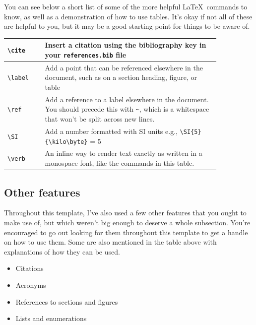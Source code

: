 You can see below a short list of some of the more helpful \LaTeX\ commands to know, as well as a
demonstration of how to use tables. It's okay if not all of these are helpful to you, but it may
be a good starting point for things to be aware of.

\begin{table}[ht]
	\centering
	\begin{tabular}{|p{0.15\linewidth}|p{0.70\linewidth}|}
		\hline
		\verb|\cite|  & Insert a citation using the bibliography key in your \verb|references.bib| file                              \\
		\hline
		\verb|\label| & Add a point that can be referenced elsewhere in the document, such as on a section heading, figure, or table \\
		\hline
		\verb|\ref|   & Add a reference to a label elsewhere in the document. You should precede
		this with \verb|~|, which is a whitespace that won't be split across new lines.                                              \\
		\hline
		\verb|\SI|    & Add a number formatted with SI units e.g., \verb|\SI{5}{\kilo\byte}| = \SI{5}{\kilo\byte}                    \\
		\hline
		\verb|\verb|  & An inline way to render text exactly as written in a monospace font, like the commands in this table.        \\
		\hline
	\end{tabular}
\end{table}

\subsection{Other features}

Throughout this template, I've also used a few other features that you ought to make use of, but
which weren't big enough to deserve a whole subsection. You're encouraged to go out looking for
them throughout this template to get a handle on how to use them. Some are also mentioned in the
table above with explanations of how they can be used.

\begin{itemize}
	\item Citations
	\item Acronyms
	\item References to sections and figures
	\item Lists and enumerations
\end{itemize}

